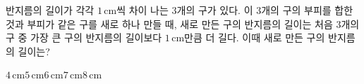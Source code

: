 반지름의 길이가 각각 $1\,\mathrm{cm}$씩 차이 나는 $3$개의 구가 있다. 이 $3$개의 구의 부피를 합한 것과 부피가 같은 구를 새로 하나 만들 때, 새로 만든 구의 반지름의 길이는 처음 $3$개의 구 중 가장 큰 구의 반지름의 길이보다 $1\,\mathrm{cm}$만큼 더 길다. 이때 새로 만든 구의 반지름의 길이는?
\begin{choices32}{$4\,\mathrm{cm}$}{$5\,\mathrm{cm}$}{$6\,\mathrm{cm}$}{$7\,\mathrm{cm}$}{$8\,\mathrm{cm}$}\end{choices32}
